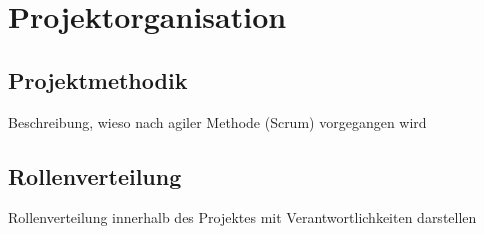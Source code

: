 \documentclass[%
	12pt,
	a4paper,
	oneside,
	parskip=full
]{scrbook}
\begin{document}
\chapter{Projektorganisation}
\section{Projektmethodik}
Beschreibung, wieso nach agiler Methode (Scrum) vorgegangen wird
\section{Rollenverteilung}
Rollenverteilung innerhalb des Projektes mit Verantwortlichkeiten darstellen
\end{document}
